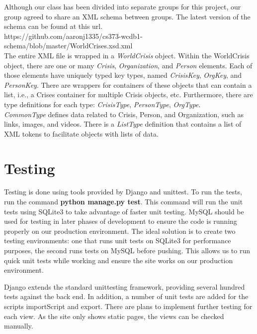 \documentclass[12pt]{report}
\begin{document}
Although our class has been divided into separate groups for this project, our group agreed to share an XML schema between groups.
The latest version of the schema can be found at this url.\\

\noindent \small
https://github.com/aaronj1335/cs373-wcdb1-schema/blob/master/WorldCrises.xsd.xml\\


The entire XML file is wrapped in a \emph{WorldCrisis} object.
Within the WorldCrisis object, there are one or many \emph{Crisis}, \emph{Organization}, and \emph{Person} elements.
Each of those elements have uniquely typed key types, named \emph{CrisisKey}, \emph{OrgKey}, and \emph{PersonKey}.
There are wrappers for containers of these objects that can contain a list,
i.e., a Crises container for multiple Crisis objects, etc.
Furthermore, there are type definitions for each type: \emph{CrisisType}, \emph{PersonType}, \emph{OrgType}.\\


\emph{CommonType} defines data related to Crisis, Person, and Organization,
such as links, images, and videos.
There is a \emph{ListType} definition that contains a list of XML tokens to facilitate objects with lists of data.

\newpage
\section*{Testing}
\hfill


Testing is done using tools provided by Django and unittest.
To run the tests, run the command \textbf{python manage.py test}.
This command will run the unit tests using SQLite3 to take advantage of faster unit testing.
MySQL should be used for testing in later phases of development to ensure the code is running properly on our production environment.
The ideal solution is to create two testing environments: one that runs unit tests on SQLite3 for performance purposes,
the second runs tests on MySQL before pushing.
This allows us to run quick unit tests while working and ensure the site works on our production environment.


Django extends the standard unittesting framework, providing several hundred tests against the back end.
In addition, a number of unit tests are added for the scripts importScript and export.
There are plans to implement further testing for each view.
As the site only shows static pages, the views can be checked manually.
\end{document}
